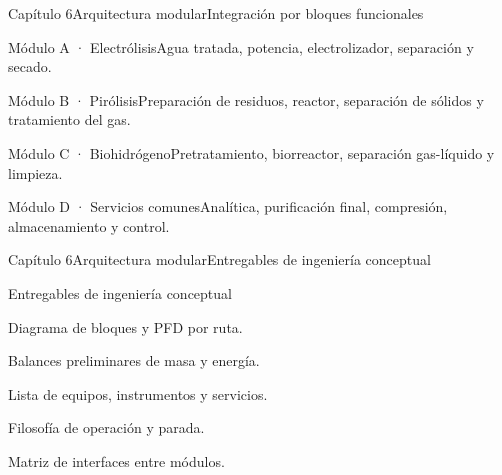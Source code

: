 \begin{HVTPage}{Capítulo 6}{Arquitectura modular}{Integración por bloques funcionales}
\begin{HVTGrid}
\begin{HVTColumn}{Módulo A · Electrólisis}Agua tratada, potencia, electrolizador, separación y secado.\end{HVTColumn}
\begin{HVTColumn}{Módulo B · Pirólisis}Preparación de residuos, reactor, separación de sólidos y tratamiento del gas.\end{HVTColumn}
\begin{HVTColumn}{Módulo C · Biohidrógeno}Pretratamiento, biorreactor, separación gas-líquido y limpieza.\end{HVTColumn}
\begin{HVTColumn}{Módulo D · Servicios comunes}Analítica, purificación final, compresión, almacenamiento y control.\end{HVTColumn}
\end{HVTGrid}
\end{HVTPage}

\begin{HVTPage}{Capítulo 6}{Arquitectura modular}{Entregables de ingeniería conceptual}
\begin{HVTTask}{Entregables de ingeniería conceptual}\item Diagrama de bloques y PFD por ruta. \item Balances preliminares de masa y energía. \item Lista de equipos, instrumentos y servicios. \item Filosofía de operación y parada. \item Matriz de interfaces entre módulos.\end{HVTTask}
\end{HVTPage}
